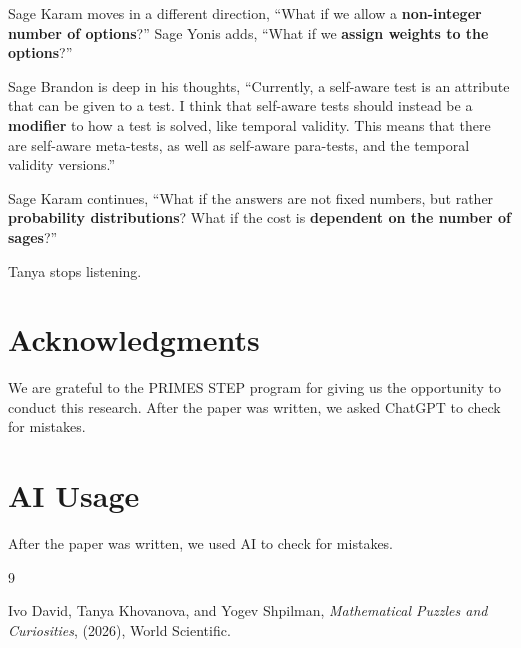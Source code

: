 \documentclass[12pt,reqno]{article}
\theoremstyle{plain}
\theoremstyle{definition}
\theoremstyle{remark}
\begin{document}
Sage Karam moves in a different direction, ``What if we allow a \textbf{non-integer number of options}?'' Sage Yonis adds, ``What if we \textbf{assign weights to the options}?''

Sage Brandon is deep in his thoughts, ``Currently, a self-aware test is an attribute that can be given to a test. I think that self-aware tests should instead be a \textbf{modifier} to how a test is solved, like temporal validity. This means that there are self-aware meta-tests, as well as self-aware para-tests, and the temporal validity versions.''

Sage Karam continues, ``What if the answers are not fixed numbers, but rather \textbf{probability distributions}? What if the cost is \textbf{dependent on the number of sages}?''

Tanya stops listening.

\section{Acknowledgments}

We are grateful to the PRIMES STEP program for giving us the opportunity to conduct this research. After the paper was written, we asked ChatGPT to check for mistakes.

\section{AI Usage}

After the paper was written, we used AI to check for mistakes.

\begin{thebibliography}{9}

 Ivo David, Tanya Khovanova, and Yogev Shpilman, \textit{Mathematical Puzzles and Curiosities}, (2026), World Scientific.

\end{thebibliography}
\end{document}
